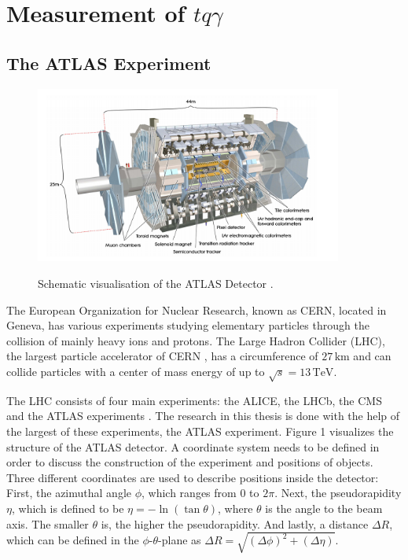 


\chapter{Measurement of \texorpdfstring{$tq\gamma$}{tqGamma}}
\label{chap:measurement}

\section{The ATLAS Experiment}
\label{sec:atlas}
\begin{figure}
    \centering
    \includegraphics[width=0.9\textwidth]{Plots/atlasSCHEMA.PNG}
    \label{fig:atlasschema}
    \caption{Schematic visualisation of the ATLAS Detector \cite{Collaboration_2008}.}
\end{figure}

The European Organization for Nuclear Research, known as CERN, located in Geneva, has various experiments studying elementary particles through the collision of mainly heavy ions and protons. 
The Large Hadron Collider (LHC), the largest particle accelerator of CERN \cite{LHC}, has a circumference of $27 \,\si{\kilo\metre}$ and can collide particles with a center of mass energy of up to $\sqrt{s} = 13 \,\si{\tera\electronvolt}$. 


The LHC consists of four main experiments: the ALICE, the LHCb, the CMS and the ATLAS experiments \cite{Collaboration_2008}. The research in this thesis is done with the help of the largest of these experiments, the ATLAS experiment. Figure 1 visualizes the structure of the ATLAS detector. 
A coordinate system needs to be defined in order to discuss the construction of the experiment and positions of objects. Three different coordinates are used to describe positions inside the detector: First, the azimuthal angle $\phi$, which ranges from $0$ to $2\pi$. 
Next, the pseudorapidity $\eta$, which is defined to be $\eta = -\ln(\tan \theta)$, where $\theta$ is the angle to the beam axis. The smaller $\theta$ is, the higher the pseudorapidity. And lastly, a distance $\Delta R$, which can be defined in the $\phi$-$\theta$-plane as $\Delta R = \sqrt{(\Delta \phi)^2 +(\Delta \eta)}$.

